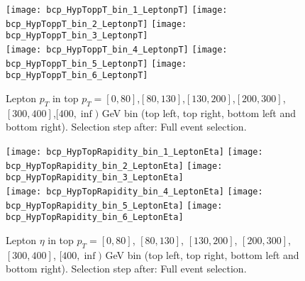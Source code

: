 \begin{landscape}
\begin{figure}
  \texttt{[image: bcp\_HypToppT\_bin\_1\_LeptonpT]}
  \texttt{[image: bcp\_HypToppT\_bin\_2\_LeptonpT]}
  \texttt{[image: bcp\_HypToppT\_bin\_3\_LeptonpT]}\\
  \texttt{[image: bcp\_HypToppT\_bin\_4\_LeptonpT]}
  \texttt{[image: bcp\_HypToppT\_bin\_5\_LeptonpT]}
  \texttt{[image: bcp\_HypToppT\_bin\_6\_LeptonpT]}
\caption{Lepton $p_T$ in top $p_T = [0,80]$,$[80,130]$,$[130,200]$,$[200,300]$,$[300,400]$,$[400,\inf)$ GeV bin (top left, top right, bottom left and bottom right). Selection step after: Full event selection.}
\end{figure}
\clearpage
\newpage



\begin{figure}
  \texttt{[image: bcp\_HypTopRapidity\_bin\_1\_LeptonEta]}
  \texttt{[image: bcp\_HypTopRapidity\_bin\_2\_LeptonEta]}
  \texttt{[image: bcp\_HypTopRapidity\_bin\_3\_LeptonEta]}\\
  \texttt{[image: bcp\_HypTopRapidity\_bin\_4\_LeptonEta]}
  \texttt{[image: bcp\_HypTopRapidity\_bin\_5\_LeptonEta]}
  \texttt{[image: bcp\_HypTopRapidity\_bin\_6\_LeptonEta]}
\caption{Lepton $\eta$ in top $p_T = [0,80]$, $[80,130]$, $[130,200]$, $[200,300]$, $[300,400]$, $[400,\inf)$ GeV bin (top left, top right, bottom left and bottom right). Selection step after: Full event selection.}
\end{figure}




\end{landscape}




